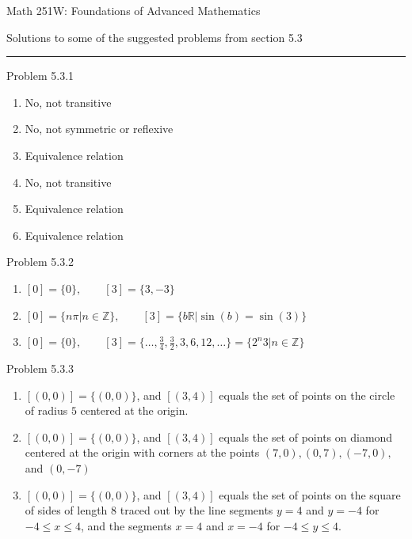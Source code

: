 \documentclass{article}
\theoremstyle{definition}
\newcommand{\R}{\mathbb{R}}
\newcommand{\Z}{\mathbb{Z}}
\begin{document}
	\begin{center}
		\Large{Math 251W: Foundations of Advanced Mathematics}

		\normalsize Solutions to some of the suggested problems from section 5.3\hrule
		\vspace{0.4cm}


	\end{center}


	\noindent Problem 5.3.1  \vspace{0.3cm}

	\begin{enumerate}
		\item No, not transitive
		\item No, not symmetric or reflexive
		\item Equivalence relation
		\item No, not transitive
		\item Equivalence relation
		\item Equivalence relation
	\end{enumerate}

	\vspace{1cm}


	\noindent Problem 5.3.2  \vspace{0.3cm}

	\begin{enumerate}
		\item $[0]=\{0\}, \qquad [3]=\{3, -3\}$
		\item $[0]=\{n\pi|n\in\Z\}, \qquad [3]=\{b\R|\sin(b)=\sin(3)\}$
		\item $[0]=\{0\}, \qquad [3]=\{\ldots,\frac{3}{4},\frac{3}{2},3,6,12,\ldots\}=\{2^n3|n\in\Z\}$
	\end{enumerate}

	\vspace{1cm}


	\noindent Problem 5.3.3  \vspace{0.3cm}

	\begin{enumerate}
		\item $[(0,0)]=\{(0,0)\}$, and $[(3,4)]$ equals the set of points on the circle of radius $5$ centered at the origin.
		\item $[(0,0)]=\{(0,0)\}$, and $[(3,4)]$ equals the set of points on diamond centered at the origin with corners at the points $(7,0), (0,7), (-7,0),$ and $(0,-7)$
		\item $[(0,0)]=\{(0,0)\}$, and $[(3,4)]$ equals the set of points on the square of sides of length 8 traced out by the line segments $y=4$ and $y=-4$ for $-4\le x\le 4$, and the segments $x=4$ and $x=-4$ for $-4\le y\le4$.
	\end{enumerate}
\end{document}

